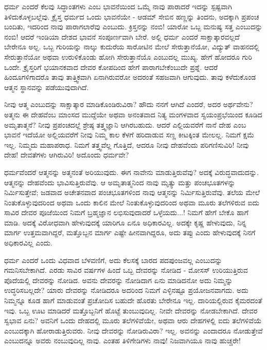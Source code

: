 ಧರ್ಮ ಎಂದರೆ ಕೆಲವು ಸಿದ್ಧಾಂತಗಳು ಎಂಬ ಭಾವನೆಯಿಂದ ಒಮ್ಮೆ ನಾವು ಪಾರಾದರೆ ಇದನ್ನು ಸ್ಪಷ್ಟವಾಗಿ ತಿಳಿದುಕೊಳ್ಳಬಲ್ಲೆವು. ಕ್ರೈಸ್ತ ಧರ್ಮದ ಒಂದು ಭಾವನೆಯೇ - ಆಡಮ್​ ಸೇಬಿನ ಹಣ್ಣನ್ನು ತಿಂದನು, ಅದಕ್ಕಾಗಿ ಪ್ರಪಂಚ ಬಂದಿತು, ಇದರಿಂದ ನಾವು ಪಾರಾಗಲಾರೆವು ಎಂಬುದು. ಕ್ರಿಸ್ತನನ್ನು ನಂಬಿ! ಯಾರೋ ಒಬ್ಬ ಮನುಷ್ಯ ಸತ್ತ ಎಂಬುದನ್ನು ನಂಬಿ! ಆದರೆ ಇಂಡಿಯಾ ದೇಶದ ಭಾವನೆ ಸಂಪೂರ್ಣವಾಗಿ ಬೇರೆ. ಅಲ್ಲಿ ಧರ್ಮ ಎಂದರೆ ಸಾಕ್ಷಾತ್ಕಾರವಲ್ಲದೆ ಬೇರೇನೂ ಅಲ್ಲ. ಒಬ್ಬ ಗುರಿಯನ್ನು ನಾಲ್ಕು ಕುದುರೆಯ ಸಾರೋಟಿನ ಮೇಲೆ ಸೇರುತ್ತಾನೆಯೋ, ವಿದ್ಯುತ್​ ವಾಹನದಲ್ಲಿ ಸೇರುತ್ತಾನೆಯೋ ಅಥವಾ ಉರುಳಿಕೊಂಡು ಹೋಗಿ ಸೇರುತ್ತಾನೆಯೊ ಎಂಬುದಲ್ಲ ಮುಖ್ಯ. ಹೇಗೆ ಹೋದರೂ ಗುರಿ ಒಂದೇ. ಕ್ರೈಸ್ತರಿಗೆ ಭಯಾನಕವಾದ ದೇವರ ಕೋಪದಿಂದ ಹೇಗೆ ಪಾರಾಗಬೇಕೆಂಬುದೇ ಪ್ರಶ್ನೆ. ಆದರೆ ಹಿಂದೂಗಳಿಗಾದರೊ ತಾವು ತಾತ್ತ್ವಿಕವಾಗಿ ಏನಾಗಿರುವರೋ ಅದರಂತೆ ಸಹಜವಾಗಿ ಆಗುವುದು. ತಾವು ಕಳೆದುಕೊಂಡ ಆತ್ಮನ ಸ್ಥಾನವನ್ನು ಪಡೆಯುವುದಾಗಿದೆ.

ನೀವು ಆತ್ಮ ಎಂಬುದನ್ನು ಸಾಕ್ಷಾತ್ಕಾರ ಮಾಡಿಕೊಂಡಿರುವಿರಾ? ಹೌದು ನನಗೆ ಆಗಿದೆ ಎಂದರೆ, ಅದರ ಅರ್ಥವೇನು? ಅತ್ಮನು ಈ ದೇಹವೆಂಬ ಮಾಂಸದ ಮುದ್ದೆಯೇ ಅಥವಾ ಅನಂತವಾದ ನಿತ್ಯ ಮಂಗಳವಾದ ಸ್ವಯಂಪ್ರಭೆಯಿಂದ ಕೂಡಿದ ಅಮೃತಾತ್ಮನೆ? ನೀವು ಪ್ರಪಂಚದಲ್ಲೆ ಶ್ರೇಷ್ಠ ತತ್ತ್ವಜ್ಞಾನಿ ಆಗಿರಬಹುದು. ಆದರೆ ಎಲ್ಲಿಯವರೆಗೆ ನಾನೆ ದೇಹ ಎಂಬ ಭಾವನೆ ಇದೆಯೋ ಅಲ್ಲಿಯವರೆಗೆ ನೀವು ನಿಮ್ಮ ಕಾಲ ಕೆಳಗೆ ಹರಿದಾಡುವ ಸಣ್ಣ ಕೀಟಕ್ಕಿಂತ ಮೇಲಲ್ಲ. ನಿಮಗೆ ಕ್ಷಮೆ ಇಲ್ಲ. ನಿಮ್ಮದು ಮಹಾಪರಾಧ. ನಿಮಗೆ ತತ್ತ್ವವೆಲ್ಲ ಗೊತ್ತಿದೆ, ಆದರೂ ನೀವು ದೇಹವೆಂದು ಪರಿಗಣಿಸುವಿರಿ! ನೀವು ದೇಹ! ದೇವತೆಗಳು ಆಗಿರುವಿರಿ! ಅದೊಂದು ಧರ್ಮವೇ?

ಧರ್ಮವೆಂದರೆ ಆತ್ಮನನ್ನು ಅತ್ಮನಂತೆ ಅರಿಯುವುದು. ಈಗ ನಾವೇನು ಮಾಡುತ್ತಿರುವೆವು? ಅದಕ್ಕೆ ವಿರುದ್ಧವಾದುದನ್ನು. ಆತ್ಮನನ್ನು ದೇಹವೆಂದು ಭಾವಿಸುತ್ತಿರುವೆವು. ಆ ಅಮೃತಾತ್ಮನಿಂದ ನಾವು ಮೃತ್ಯು ಮತ್ತು ಪಂಚಭೂತಗಳನ್ನು ನಿರ್ಮಿಸುತ್ತೇವೆ; ಜಡವಾದ ಅಚೇತನವಾದ ಪಂಚಭೂತಗಳಿಂದ ನಾವು ಆತ್ಮನನ್ನು ನಿರ್ಮಿಸುತ್ತಿರುವೆವು. ತಲೆಯ ಮೇಲೆ ನಿಂತುಕೊಳ್ಳುವುದರಿಂದ ಅಥವಾ ಒಂದು ಕಾಲಿನ ಮೇಲೆ ನಿಂತುಕೊಳ್ಳುವುದರಿಂದ ಅಥವಾ ಮೂರು ತಲೆಗಳಿರುವ ಐದು ಸಾವಿರ ದೇವರ ಪೂಜೆಯಿಂದ ನಿಮಗೆ ಬ್ರಹ್ಮಜ್ಞಾನ ಲಭಿಸುವುದಾದರೆ ಒಳ್ಳೆಯದು...! ನಿಮಗೆ ಹೇಗೆ ಬೇಕೊ ಹಾಗೆ ಮಾಡಿ. ಅದಕ್ಕೆ ವಿರೋಧವಾಗಿ ಹೇಳುವುದಕ್ಕೆ ಯಾರಿಗೂ ಏನೂ ಅಧಿಕಾರವಿಲ್ಲ. ಅದಕ್ಕೇ ಕೃಷ್ಣ ಹೇಳುವುದು, ನಿನ್ನ ಮಾರ್ಗ ಉತ್ತಮವಾಗಿದ್ದರೆ, ಮತ್ತೊಬ್ಬನ ಮಾರ್ಗ ಎಷ್ಟೇ ಹೀನವಾಗಿದ್ದರೂ, ಅದು ತಪ್ಪು ಎಂದು ಹೇಳುವುದಕ್ಕೆ ನಿನಗೆ ಅಧಿಕಾರವಿಲ್ಲ ಎಂದು.

ಧರ್ಮ ಎಂದರೆ ಒಂದು ವಿಧವಾದ ಬೆಳವಣಿಗೆ, ಅದು ಕೆಲಸಕ್ಕೆ ಬಾರದ ಪದಪುಂಜವಲ್ಲ ಎಂಬುದನ್ನು ಗಮನಿಸಬೇಕಾಗಿದೆ. ಎರಡು ಸಾವಿರ ವರ್ಷಗಳ ಹಿಂದೆ ಒಬ್ಬ ದೇವರನ್ನು ನೋಡಿದ - ಮೋಸಸ್​ ಉರಿಯುತ್ತಿರುವ ಪೊದೆಯಲ್ಲಿ ದೇವರನ್ನು ನೋಡಿದ. ಅವನು ದೇವರನ್ನು ನೋಡಿದಾಗ ಏನು ಮಾಡಿದನೋ ಅದು ನಿಮ್ಮನ್ನು ಉದ್ಧರಿಸಬಲ್ಲದೇ? ಯಾರು ದೇವರನ್ನು ನೋಡಿದರೂ ಅದರಿಂದ ನಿಮಗೆ ಎಳ್ಳಿನಷ್ಟೂ ಪ್ರಯೋಜನವಾಗದು. ಅದು ನಿಮ್ಮನ್ನೂ ಕೂಡ ಹಾಗೆ ಮಾಡುವಂತೆ ಪ್ರಚೋದಿಸ ಬಹುದೇ ಹೊರತು ಬೇರೇನೂ ಇಲ್ಲ. ದಾರಿಯಲ್ಲಿರುವ ಕೈಮರದಂತೆ ಇವು. ಒಬ್ಬ ಊಟ ಮಾಡಿದರೆ ಮತ್ತೊಬ್ಬನಿಗೆ ಹೊಟ್ಟೆ ತುಂಬುವುದಿಲ್ಲ. ನೀವೇ ದೇವರನ್ನು ನೋಡಬೇಕಾಗಿದೆ. ದೇವರ ಸ್ವಭಾವ ಏನು? ಅವನಿಗೆ ಒಂದು ದೇಹದಲ್ಲಿ ಮೂರು ತಲೆಗಳಿವೆಯೇ, ಅಥವಾ ಆರು ದೇಹಗಳಲ್ಲಿ ಐದು ತಲೆಗಳಿವೆಯೆ ಎಂಬುದಕ್ಕಾಗಿ ಹೋರಾಡುತ್ತಿರುವರು. ನೀವು ದೇವರನ್ನು ನೋಡಿರುವಿರಾ? ಇಲ್ಲ. ಅವನನ್ನು ಎಂದಾದರೂ ನೋಡುತ್ತೇವೆ ಎಂಬುದನ್ನೂ ಅವರು ನಂಬುವುದಿಲ್ಲ ನಾವು. ಎಂತಹ ತಿಳಿಗೇಡಿಗಳು ನಾವು! ನಿಜವಾಗಿಯೂ ನಾವು ಹುಚ್ಚರೇ!

